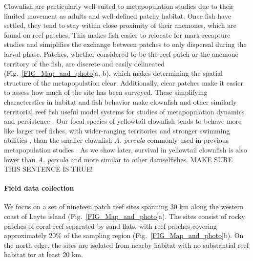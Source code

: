 \documentclass[12pt, oneside]{article}   	%
\begin{document}
Clownfish are particularly well-suited to metapopulation studies due to their limited movement as adults and well-defined patchy habitat. Once fish have settled, they tend to stay within close proximity of their anemones, which are found on reef patches. This makes fish easier to relocate for mark-recapture studies and simiplifies the exchange between patches to only dispersal during the larval phase. Patches, whether considered to be the reef patch or the anemone territory of the fish, are discrete and easily delineated (Fig.\ \ref{FIG_Map_and_photo}a, b), which makes determining the spatial structure of the metapopulation clear. Additionally, clear patches make it easier to assess how much of the site has been surveyed. These simplifying characterstics in habitat and fish behavior make clownfish and other similarly territorial reef fish useful model systems for studies of metapopulation dynamics and persistence \citep[e.g.][]{buston2013marine, salles_coral_2015, johnson2018integrating}. Our focal species of yellowtail clownfish tends to behave more like larger reef fishes, with wider-ranging territories and stronger swimming abilities \citep{hattori1991life, ochi1989mating}, than the smaller clownfish \textit{A. percula} commonly used in previous metapopulation studies \citep[e.g.][]{buston2011probability, salles_coral_2015}. As we show later, survival in yellowtail clownfish is also lower than \textit{A. percula} and more similar to other damselfishes. MAKE SURE THIS SENTENCE IS TRUE!

\paragraph*{Field data collection}

We focus on a set of nineteen patch reef sites spanning 30 km along the western coast of Leyte island (Fig.\ \ref{FIG_Map_and_photo}a). The sites consist of rocky patches of coral reef separated by sand flats, with reef patches covering approximately 20\% of the sampling region (Fig.\ \ref{FIG_Map_and_photo}b). On the north edge, the sites are isolated from nearby habitat with no substantial reef habitat for at least 20 km. %
\end{document}
